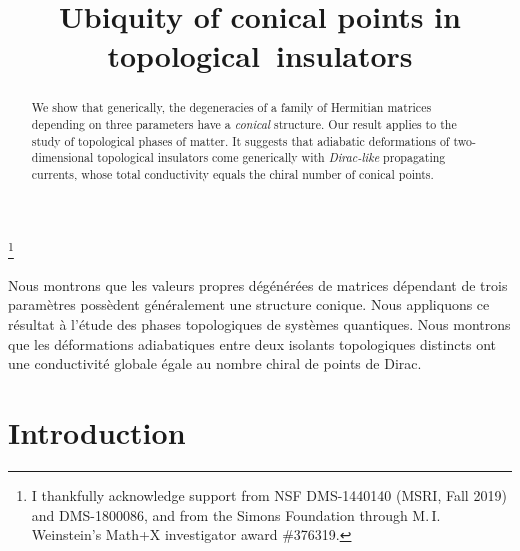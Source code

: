 \documentclass[JEP,XML,SOM,Unicode,NoFloatCountersInSection]{cedram}
\theoremstyle{definition}
\begin{document}
\frontmatter
\title[Ubiquity of conical points in topological insulators]{Ubiquity of conical points in topological~insulators}

\author[\initial{A.} \lastname{Drouot}]{ }
\address{Padelford Hall, University of Washington\\
W Stevens Way NE, Seattle, WA 98105, USA}
\urladdr{}

\thanks{
I thankfully acknowledge support from NSF DMS-1440140 (MSRI, Fall 2019) and DMS-1800086, and from the Simons Foundation through M.\,I.\,Weinstein’s Math+X investigator award \#376319.}

\begin{abstract}
We show that generically, the degeneracies of a family of Hermitian matrices depending on three parameters have a \textit{conical} structure. Our result applies to the study of topological phases of matter. It suggests that adiabatic deformations of two-dimensional topological insulators come generically with \textit{Dirac-like} propagating currents, whose total conductivity equals the chiral number of conical points.
\end{abstract}





\begin{altabstract}
Nous montrons que les valeurs propres dégénérées de matrices dépendant de trois paramètres possèdent généralement une structure conique. Nous appliquons ce résultat à l'étude des phases topologiques de systèmes quantiques. Nous montrons que les déformations adiabatiques entre deux isolants topologiques distincts ont une conductivité globale égale au nombre chiral de points de Dirac.
\end{altabstract}

\maketitle
\vspace*{-\baselineskip}
\tableofcontents
\mainmatter
\section{Introduction}
\end{document}
